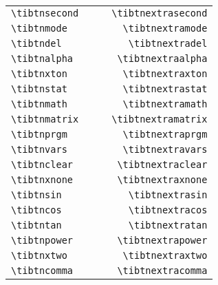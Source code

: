 \documentclass[a4paper,12pt]{article}
\begin{document}
\begin{center}
	\begin{longtable}{lrlr}
		\verb|\tibtnsecond|     & \tibtnsecond     & \tibtnextrasecond     & \verb|\tibtnextrasecond|     \\
		\verb|\tibtnmode|       & \tibtnmode       & \tibtnextramode       & \verb|\tibtnextramode|       \\
		\verb|\tibtndel|        & \tibtndel        & \tibtnextradel        & \verb|\tibtnextradel|        \\
		\verb|\tibtnalpha|      & \tibtnalpha      & \tibtnextraalpha      & \verb|\tibtnextraalpha|      \\
		\verb|\tibtnxton|       & \tibtnxton       & \tibtnextraxton       & \verb|\tibtnextraxton|       \\
		\verb|\tibtnstat|       & \tibtnstat       & \tibtnextrastat       & \verb|\tibtnextrastat|       \\
		\verb|\tibtnmath|       & \tibtnmath       & \tibtnextramath       & \verb|\tibtnextramath|       \\
		\verb|\tibtnmatrix|     & \tibtnmatrix     & \tibtnextramatrix     & \verb|\tibtnextramatrix|     \\
		\verb|\tibtnprgm|       & \tibtnprgm       & \tibtnextraprgm       & \verb|\tibtnextraprgm|       \\
		\verb|\tibtnvars|       & \tibtnvars       & \tibtnextravars       & \verb|\tibtnextravars|       \\
		\verb|\tibtnclear|      & \tibtnclear      & \tibtnextraclear      & \verb|\tibtnextraclear|      \\
		\verb|\tibtnxnone|      & \tibtnxnone      & \tibtnextraxnone      & \verb|\tibtnextraxnone|      \\
		\verb|\tibtnsin|        & \tibtnsin        & \tibtnextrasin        & \verb|\tibtnextrasin|        \\
		\verb|\tibtncos|        & \tibtncos        & \tibtnextracos        & \verb|\tibtnextracos|        \\
		\verb|\tibtntan|        & \tibtntan        & \tibtnextratan        & \verb|\tibtnextratan|        \\
		\verb|\tibtnpower|      & \tibtnpower      & \tibtnextrapower      & \verb|\tibtnextrapower|      \\
		\verb|\tibtnxtwo|       & \tibtnxtwo       & \tibtnextraxtwo       & \verb|\tibtnextraxtwo|       \\
		\verb|\tibtncomma|      & \tibtncomma      & \tibtnextracomma      & \verb|\tibtnextracomma|      \\

\end{longtable}
\end{center}
\end{document}

